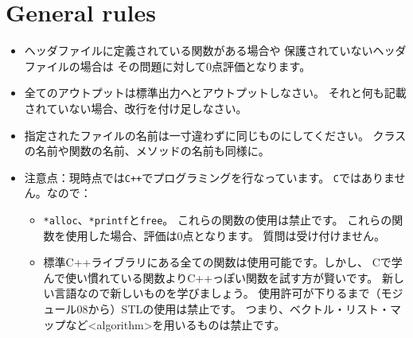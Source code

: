 

\chapter{General rules}


    \begin{itemize}

		\item ヘッダファイルに定義されている関数がある場合や
            保護されていないヘッダファイルの場合は
            その問題に対して0点評価となります。

		\item 全てのアウトプットは標準出力へとアウトプットしなさい。
            それと何も記載されていない場合、改行を付け足しなさい。

		\item 指定されたファイルの名前は一寸違わずに同じものにしてください。
            クラスの名前や関数の名前、メソッドの名前も同様に。

		\item 注意点：現時点では\texttt{C++}でプログラミングを行なっています。
            \texttt{C}ではありません。なので：
	  
		  \begin{itemize}
		  
		  \item	\texttt{*alloc}、\texttt{*printf}と\texttt{free}。
            これらの関数の使用は禁止です。
            これらの関数を使用した場合、評価は0点となります。
            質問は受け付けません。

		  \item 標準C++ライブラリにある全ての関数は使用可能です。しかし、
            Cで学んで使い慣れている関数よりC++っぽい関数を試す方が賢いです。
            新しい言語なので新しいものを学びましょう。
            使用許可が下りるまで（モジュール08から）STLの使用は禁止です。
            つまり、ベクトル・リスト・マップなど<algorithm>を用いるものは禁止です。


\end{itemize}
\end{itemize}
